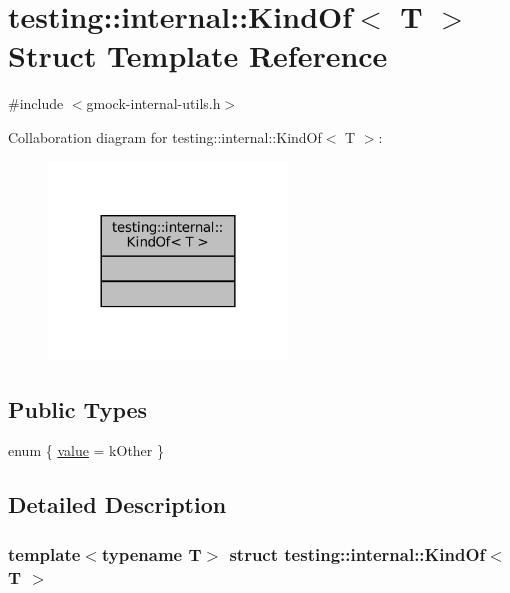 \hypertarget{structtesting_1_1internal_1_1KindOf}{}\section{testing\+:\+:internal\+:\+:Kind\+Of$<$ T $>$ Struct Template Reference}
\label{structtesting_1_1internal_1_1KindOf}


{\ttfamily \#include $<$gmock-\/internal-\/utils.\+h$>$}



Collaboration diagram for testing\+:\+:internal\+:\+:Kind\+Of$<$ T $>$\+:
\nopagebreak
\begin{figure}[H]
\begin{center}
\leavevmode
\includegraphics[width=180pt]{structtesting_1_1internal_1_1KindOf__coll__graph}
\end{center}
\end{figure}
\subsection*{Public Types}
\begin{DoxyCompactItemize}
\item 
enum \{ \hyperlink{structtesting_1_1internal_1_1KindOf_a55a5b5bd128ab096347b33bdfef12c60a30d28b30579739dfb2d410825ac3aaa8}{value} = k\+Other
 \}
\end{DoxyCompactItemize}


\subsection{Detailed Description}
\subsubsection*{template$<$typename T$>$\newline
struct testing\+::internal\+::\+Kind\+Of$<$ T $>$}



